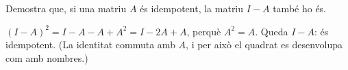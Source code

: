 \begin{apartats}
\begin{nomesllarg}
Demostra que, si una matriu $A$ és idempotent, la matriu $I-A$ també ho és.

\begin{solucio}
$(I-A)^2=I-A-A+A^2=I-2A+A$, perquè $A^2=A$. Queda $I-A$: és idempotent. (La identitat commuta amb $A$,
i per això el quadrat es desenvolupa com amb nombres.)
\end{solucio}
\end{nomesllarg}

\end{apartats}
